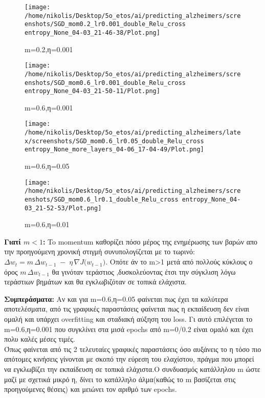 \documentclass[a4paper,11pt]{article}
\begin{document}
\begin{figure}[H]
    \centering
    \texttt{[image: /home/nikolis/Desktop/5o\_etos/ai/predicting\_alzheimers/screenshots/SGD\_mom0.2\_lr0.001\_double\_Relu\_cross entropy\_None\_04-03\_21-46-38/Plot.png]}
    \caption{m=0.2,η=0.001}
    \label{fig:double}
\end{figure}

\begin{figure}[H]
    \centering
    \texttt{[image: /home/nikolis/Desktop/5o\_etos/ai/predicting\_alzheimers/screenshots/SGD\_mom0.6\_lr0.001\_double\_Relu\_cross entropy\_None\_04-03\_21-50-11/Plot.png]}
    \caption{m=0.6,η=0.001}
    \label{fig:half}
\end{figure}

\begin{figure}[H]
    \centering
    \texttt{[image: /home/nikolis/Desktop/5o\_etos/ai/predicting\_alzheimers/latex/screenshots/SGD\_mom0.6\_lr0.05\_double\_Relu\_cross entropy\_None\_more\_layers\_04-06\_17-04-49/Plot.png]}
    \caption{m=0.6,η=0.05}
    \label{fig:same}
\end{figure}

\begin{figure}[H]
    \centering
    \texttt{[image: /home/nikolis/Desktop/5o\_etos/ai/predicting\_alzheimers/screenshots/SGD\_mom0.6\_lr0.1\_double\_Relu\_cross entropy\_None\_04-03\_21-52-53/Plot.png]}
    \caption{m=0.6,η=0.01}
    \label{fig:two_thirds}
\end{figure}

\noindent
\textbf{Γιατί $m < 1$:} To momentum καθορίζει πόσο μέρος της ενημέρωσης των βαρών απο την προηγούμενη χρονική στιγμή συνυπολογίζεται με το τωρινό:
\(\Delta w_{t} = m\,\Delta w_{t-1} \;-\; \eta\,\nabla J\bigl(w_{t-1}\bigr)\).
Οπότε άν το m>1 μετά από πολλούς κύκλους ο όρος \( m\,\Delta w_{t-1} \) θα γινόταν τεράστιος ,δυσκολεύοντας έτσι την σύγκλιση λόγω τεράστιων βημάτων και θα εγκλωβιζόταν σε τοπικά ελάχιστα.


\noindent
\textbf{Συμπεράσματα:} Αν και για m=0.6,η=0.05 φαίνεται πως έχει τα καλύτερα αποτελέσματα, από τις γραφικές παραστάσεις φαίνεται πως η εκπαίδευση δεν είναι ομαλή και υπάρχει overfitting και σταδιακή αύξηση του loss.
Γι αυτό επιλέγεται το m=0.6,η=0.001 που συγκλίνει στα μισά epochs από m=0/0.2 είναι ομαλό και έχει πολυ καλές μέσες τιμές.\\Όπως φαίνεται από τις 2 τελευταίες γραφικές παραστάσεις όσο αυξάνεις το η τόσο πιο απότομες κινήσεις γίνονται με σκοπό την εύρεση του ελαχίστου, 
πράγμα που μπορεί να εγκλωβίζει την εκπαίδευση σε τοπικά ελάχιστα.Ο συνδυασμός κατάλληλου m  ώστε μαζί με σχετικά μικρό η, δίνει το κατάλληλο άλμα(καθώς το m βασίζεται στις προηγούμενες θέσεις) και μειώνει τον αριθμό των epochs.
\end{document}
